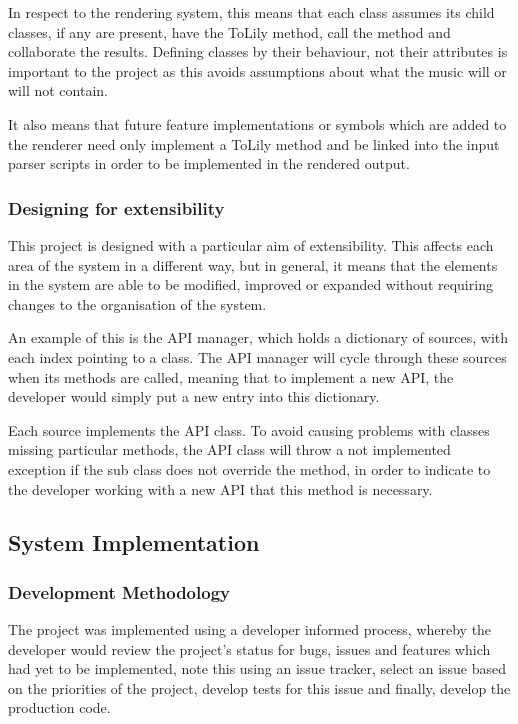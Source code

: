 In respect to the rendering system, this means that each class assumes its child classes, if any are present, have the ToLily method, call the method and collaborate the results. Defining classes by their behaviour, not their attributes is important to the project as this avoids assumptions about what the music will or will not contain. 

It also means that future feature implementations or symbols which are added to the renderer need only implement a ToLily method and be linked into the input parser scripts in order to be implemented in the rendered output.

\subsubsection{Designing for extensibility}
This project is designed with a particular aim of extensibility. This affects each area of the system in a different way, but in general, it means that the elements in the system are able to be modified, improved or expanded without requiring changes to the organisation of the system. 

An example of this is the API manager, which holds a dictionary of sources, with each index pointing to a class. The API manager will cycle through these sources when its methods are called, meaning that to implement a new API, the developer would simply put a new entry into this dictionary.

Each source implements the API class. To avoid causing problems with classes missing particular methods, the API class will throw a not implemented exception if the sub class does not override the method, in order to indicate to the developer working with a new API that this method is necessary.


\subsection{System Implementation}
\subsubsection{Development Methodology}
The project was implemented using a developer informed process, whereby the developer would review the project's status for bugs, issues and features which had yet to be implemented, note this using an issue tracker, select an issue based on the priorities of the project, develop tests for this issue and finally, develop the production code. 


